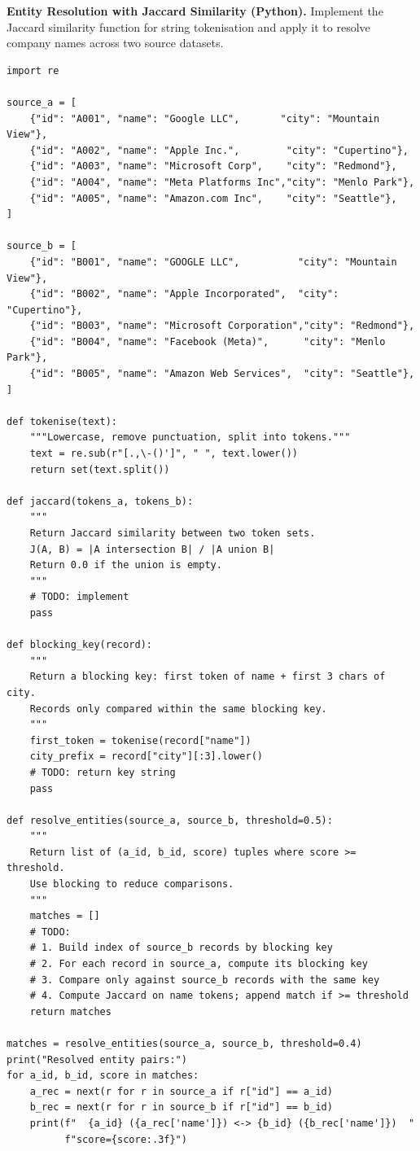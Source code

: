 \bigskip
{}

\pe \textbf{Entity Resolution with Jaccard Similarity (Python).}
Implement the Jaccard similarity function for string tokenisation and
apply it to resolve company names across two source datasets.

\begin{lstlisting}[style=pyspark, caption={PE2.1: Company name entity resolution}]
import re

source_a = [
    {"id": "A001", "name": "Google LLC",       "city": "Mountain View"},
    {"id": "A002", "name": "Apple Inc.",        "city": "Cupertino"},
    {"id": "A003", "name": "Microsoft Corp",    "city": "Redmond"},
    {"id": "A004", "name": "Meta Platforms Inc","city": "Menlo Park"},
    {"id": "A005", "name": "Amazon.com Inc",    "city": "Seattle"},
]

source_b = [
    {"id": "B001", "name": "GOOGLE LLC",          "city": "Mountain View"},
    {"id": "B002", "name": "Apple Incorporated",  "city": "Cupertino"},
    {"id": "B003", "name": "Microsoft Corporation","city": "Redmond"},
    {"id": "B004", "name": "Facebook (Meta)",      "city": "Menlo Park"},
    {"id": "B005", "name": "Amazon Web Services",  "city": "Seattle"},
]

def tokenise(text):
    """Lowercase, remove punctuation, split into tokens."""
    text = re.sub(r"[.,\-()']", " ", text.lower())
    return set(text.split())

def jaccard(tokens_a, tokens_b):
    """
    Return Jaccard similarity between two token sets.
    J(A, B) = |A intersection B| / |A union B|
    Return 0.0 if the union is empty.
    """
    # TODO: implement
    pass

def blocking_key(record):
    """
    Return a blocking key: first token of name + first 3 chars of city.
    Records only compared within the same blocking key.
    """
    first_token = tokenise(record["name"])
    city_prefix = record["city"][:3].lower()
    # TODO: return key string
    pass

def resolve_entities(source_a, source_b, threshold=0.5):
    """
    Return list of (a_id, b_id, score) tuples where score >= threshold.
    Use blocking to reduce comparisons.
    """
    matches = []
    # TODO:
    # 1. Build index of source_b records by blocking key
    # 2. For each record in source_a, compute its blocking key
    # 3. Compare only against source_b records with the same key
    # 4. Compute Jaccard on name tokens; append match if >= threshold
    return matches

matches = resolve_entities(source_a, source_b, threshold=0.4)
print("Resolved entity pairs:")
for a_id, b_id, score in matches:
    a_rec = next(r for r in source_a if r["id"] == a_id)
    b_rec = next(r for r in source_b if r["id"] == b_id)
    print(f"  {a_id} ({a_rec['name']}) <-> {b_id} ({b_rec['name']})  "
          f"score={score:.3f}")
\end{lstlisting}


